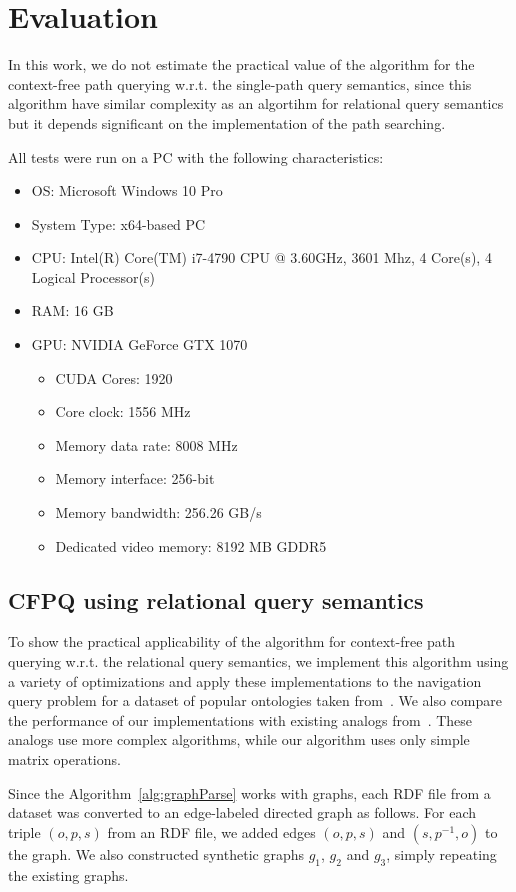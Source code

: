 \section{Evaluation}
In this work, we do not estimate the practical value of the algorithm for the context-free path querying w.r.t. the single-path query semantics, since this algorithm have similar complexity as an algortihm for relational query semantics but it depends significant on the implementation of the path searching.

All tests were run on a PC with the following characteristics:
\begin{itemize}
	\item OS: Microsoft Windows 10 Pro
	\item System Type: x64-based PC
	\item CPU: Intel(R) Core(TM) i7-4790 CPU @ 3.60GHz, 3601 Mhz, 4 Core(s), 4 Logical Processor(s)
	\item RAM: 16 GB
	\item GPU: NVIDIA GeForce GTX 1070
	\begin{itemize}
		\item CUDA Cores:		1920 
		\item Core clock:		1556 MHz 
		\item Memory data rate:	8008 MHz
		\item Memory interface:	256-bit 
		\item Memory bandwidth:	256.26 GB/s
		\item Dedicated video memory:	8192 MB GDDR5
	\end{itemize}
\end{itemize}

\subsection{CFPQ using relational query semantics}

To show the practical applicability of the algorithm for context-free path querying w.r.t. the relational query semantics, we implement this algorithm using a variety of optimizations and apply these implementations to the navigation query problem for a dataset of popular ontologies taken from~\cite{RDF}. We also compare the performance of our implementations with existing analogs from~\cite{GLL,RDF}. These analogs use more complex algorithms, while our algorithm uses only simple matrix operations.

Since the Algorithm~\ref{alg:graphParse} works with graphs, each RDF file from a dataset was converted to an edge-labeled directed graph as follows. For each triple $(o,p,s)$ from an RDF file, we added edges $(o,p,s)$ and $(s,p^{-1},o)$ to the graph. We also constructed synthetic graphs $g_1$, $g_2$ and $g_3$, simply repeating the existing graphs.

